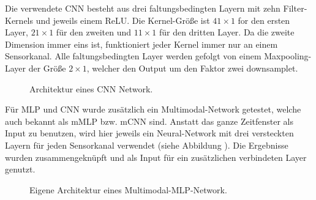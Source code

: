 Die verwendete CNN besteht aus drei faltungsbedingten Layern mit zehn Filter-Kernels und jeweils einem ReLU.
Die Kernel-Größe ist $41 \times 1$ for den ersten Layer, $21 \times 1$ für den zweiten und $11 \times 1$ für den dritten Layer.
Da die zweite Dimension immer eins ist, funktioniert jeder Kernel immer nur an einem Sensorkanal.
Alle faltungsbedingten Layer werden gefolgt von einem Maxpooling-Layer der Größe $2 \times 1$, welcher den Output um den Faktor zwei downsamplet. \\


\begin{figure}[H]
\caption{Architektur eines CNN Network. }
\label{fig:cnn} \end{figure} \vspace{0.5cm}



Für MLP und CNN wurde zusätzlich ein Multimodal-Network getestet, welche auch bekannt als mMLP bzw. mCNN sind.
Anstatt das ganze Zeitfenster als Input zu benutzen, wird hier jeweils ein Neural-Network mit drei versteckten Layern für jeden Sensorkanal verwendet (siehe Abbildung \cite{fig:multimodal_dnn}).
Die Ergebnisse wurden zusammengeknüpft und als Input für ein zusätzlichen verbindeten Layer genutzt. \\


\begin{figure}[H]
\caption{Eigene Architektur eines Multimodal-MLP-Network. }
\label{fig:multimodal_dnn} \end{figure} \vspace{0.5cm}


